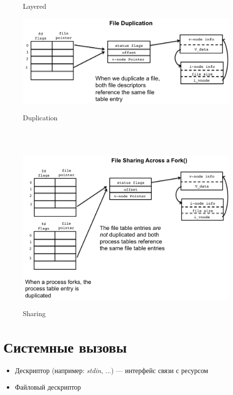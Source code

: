 \documentclass[../../lectures.tex]{subfiles}
\begin{document}
\begin{figure}[H]
\begin{minipage}[c]{0.25\linewidth}
\caption{Layered}
\end{minipage}
\hspace{0.5cm}
\begin{minipage}[c]{0.75\linewidth}
\centering
\includegraphics[scale=0.38]{images/dup.png}
\caption{Duplication}
~

~
\includegraphics[scale=0.37]{images/file-sharing.png}
\caption{Sharing}
\end{minipage}
\end{figure}

\section{Системные вызовы}
\begin{itemize}
    \item Дескриптор (например: \emph{stdin}, ...) --- интерфейс связи с ресурсом
    \item Файловый дескриптор
\end{itemize}
\end{document}
